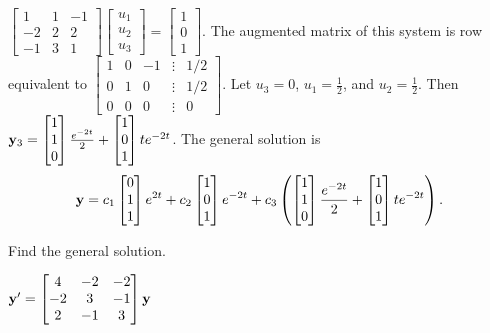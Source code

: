 \documentclass{ximera}
\begin{document}
\begin{problem}
\begin{solution}
$  \begin{bmatrix}1&1&-1\\-2&2&2\\-1&3&1\end{bmatrix} \begin{bmatrix}u_1\\u_2\\u_3\end{bmatrix}=  \begin{bmatrix}1\\0\\1\end{bmatrix}$.
The augmented matrix of this system is row equivalent to
$  \begin{bmatrix}1&0&-1&\vdots&1/2\\0&1&0&
\vdots&1/2\\0&0&0&\vdots&0 \end{bmatrix}$.
Let $u_3=0$, $u_1=\frac{1 }{2}$, and $u_2=\frac{1 }{2}$. Then ${\bf
y}_3=  \begin{bmatrix}1\\1\\0\end{bmatrix}\frac{e^{-2t} }{2}+  \begin{bmatrix}1\\0\\1\end{bmatrix}te^{-2t}$.
The general solution is
$$
{\bf y}= 
c_1 \begin{bmatrix}0\\1\\1\end{bmatrix}e^{2t}+c_2 \begin{bmatrix}1\\0\\1\end{bmatrix}e^{-2t}+c_3\left
( \begin{bmatrix}1\\1\\0\end{bmatrix}\frac{e^{-2t} }{2}+ \begin{bmatrix}1\\0\\1\end{bmatrix}te^{-2t}\right).
$$

\end{solution}
 \end{problem}


 \begin{problem}\label{exer:10.5.11}
 Find the general solution.
 
 $ {\bf y}'
= \begin{bmatrix}4&-2&-2\\-2&3&-1\\2&-1&3\end{bmatrix}{\bf y}$
 \end{problem}
\end{document}

